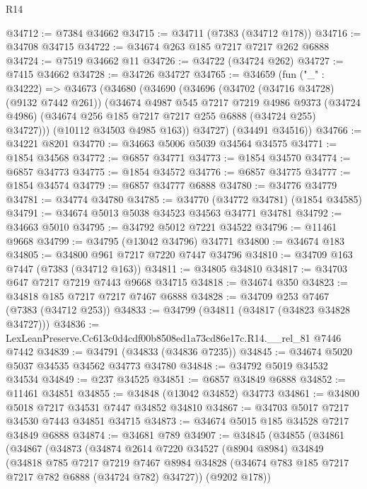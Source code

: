 \begin{lexlean}{R14}
\begin{coremodule}
@34712 := @7384 @34662
@34715 := @34711 (@7383 (@34712 @178))
@34716 := @34708 @34715
@34722 := @34674 @263 @185 @7217 @7217 @262 @6888
@34724 := @7519 @34662 @11
@34726 := @34722 (@34724 @262)
@34727 := @7415 @34662
@34728 := @34726 @34727
@34765 := @34659
    (fun ("_" : @34222) =>
    @34673
      (@34680
        (@34690
          (@34696
            (@34702 (@34716 @34728) (@9132 @7442 @261))
            (@34674
              @4987
              @545
              @7217
              @7219
              @4986
              @9373
              (@34724 @4986)
              (@34674 @256 @185 @7217 @7217 @255 @6888 (@34724 @255) @34727)))
          (@10112 @34503 @4985 @163))
        @34727)
      (@34491 @34516))
@34766 := @34221 @8201
@34770 := @34663 @5006 @5039 @34564 @34575
@34771 := @1854 @34568
@34772 := @6857 @34771
@34773 := @1854 @34570
@34774 := @6857 @34773
@34775 := @1854 @34572
@34776 := @6857 @34775
@34777 := @1854 @34574
@34779 := @6857 @34777 @6888
@34780 := @34776 @34779
@34781 := @34774 @34780
@34785 := @34770 (@34772 @34781) (@1854 @34585)
@34791 := @34674 @5013 @5038 @34523 @34563 @34771 @34781
@34792 := @34663 @5010
@34795 := @34792 @5012 @7221 @34522
@34796 := @11461 @9668
@34799 := @34795 (@13042 @34796) @34771
@34800 := @34674 @183
@34805 := @34800 @961 @7217 @7220 @7447 @34796
@34810 := @34709 @163 @7447 (@7383 (@34712 @163))
@34811 := @34805 @34810
@34817 := @34703 @647 @7217 @7219 @7443 @9668 @34715
@34818 := @34674 @350
@34823 := @34818 @185 @7217 @7217 @7467 @6888
@34828 := @34709 @253 @7467 (@7383 (@34712 @253))
@34833 := @34799 (@34811 (@34817 (@34823 @34828 @34727)))
@34836 := LexLeanPreserve.Cc613c0d4cdf00b8508ed1a73cd86e17c.R14.__rel_81 @7446 @7442
@34839 := @34791 (@34833 (@34836 @7235))
@34845 := @34674 @5020 @5037 @34535 @34562 @34773 @34780
@34848 := @34792 @5019 @34532 @34534
@34849 := @237 @34525
@34851 := @6857 @34849 @6888
@34852 := @11461 @34851
@34855 := @34848 (@13042 @34852) @34773
@34861 := @34800 @5018 @7217 @34531 @7447 @34852 @34810
@34867 := @34703 @5017 @7217 @34530 @7443 @34851 @34715
@34873 := @34674 @5015 @185 @34528 @7217 @34849 @6888
@34874 := @34681 @789
@34907 := @34845
    (@34855
      (@34861
        (@34867
          (@34873
            (@34874
              @2614
              @7220
              @34527
              (@8904 @8984)
              @34849
              (@34818
                @785
                @7217
                @7219
                @7467
                @8984
                @34828
                (@34674 @783 @185 @7217 @7217 @782 @6888 (@34724 @782) @34727))
              (@9202 @178))

\end{coremodule}
\end{lexlean}
